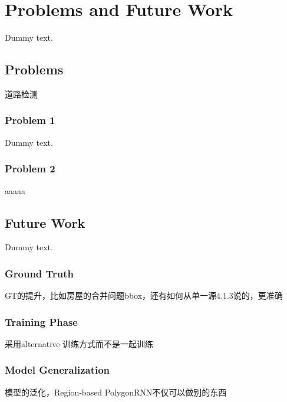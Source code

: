 \chapter{Problems and Future Work}

Dummy text.

\section{Problems}

道路检测

\subsection{Problem 1}

Dummy text.

\subsection{Problem 2}

aaaaa

\section{Future Work}

Dummy text.

\subsection{Ground Truth}

GT的提升，比如房屋的合并问题bbox，还有如何从单一源4.1.3说的，更准确

\subsection{Training Phase}

采用alternative 训练方式而不是一起训练

\subsection{Model Generalization}

模型的泛化，Region-based PolygonRNN不仅可以做别的东西
